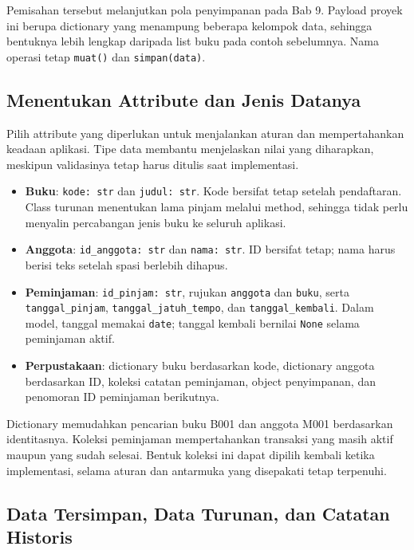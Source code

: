 Pemisahan tersebut melanjutkan pola penyimpanan pada Bab 9. Payload proyek ini berupa dictionary yang menampung beberapa kelompok data, sehingga bentuknya lebih lengkap daripada list buku pada contoh sebelumnya. Nama operasi tetap \texttt{muat()} dan \texttt{simpan(data)}.

\subsection{Menentukan Attribute dan Jenis Datanya}

Pilih attribute yang diperlukan untuk menjalankan aturan dan mempertahankan keadaan aplikasi. Tipe data membantu menjelaskan nilai yang diharapkan, meskipun validasinya tetap harus ditulis saat implementasi.

\begin{itemize}
  \item \textbf{Buku}: \texttt{kode: str} dan \texttt{judul: str}. Kode bersifat tetap setelah pendaftaran. Class turunan menentukan lama pinjam melalui method, sehingga tidak perlu menyalin percabangan jenis buku ke seluruh aplikasi.
  \item \textbf{Anggota}: \texttt{id\_anggota: str} dan \texttt{nama: str}. ID bersifat tetap; nama harus berisi teks setelah spasi berlebih dihapus.
  \item \textbf{Peminjaman}: \texttt{id\_pinjam: str}, rujukan \texttt{anggota} dan \texttt{buku}, serta \texttt{tanggal\_pinjam}, \texttt{tanggal\_jatuh\_tempo}, dan \texttt{tanggal\_kembali}. Dalam model, tanggal memakai \texttt{date}; tanggal kembali bernilai \texttt{None} selama peminjaman aktif.
  \item \textbf{Perpustakaan}: dictionary buku berdasarkan kode, dictionary anggota berdasarkan ID, koleksi catatan peminjaman, object penyimpanan, dan penomoran ID peminjaman berikutnya.
\end{itemize}

Dictionary memudahkan pencarian buku B001 dan anggota M001 berdasarkan identitasnya. Koleksi peminjaman mempertahankan transaksi yang masih aktif maupun yang sudah selesai. Bentuk koleksi ini dapat dipilih kembali ketika implementasi, selama aturan dan antarmuka yang disepakati tetap terpenuhi.

\subsection{Data Tersimpan, Data Turunan, dan Catatan Historis}

